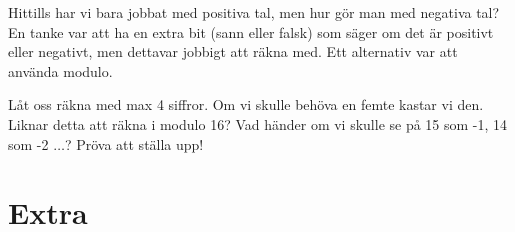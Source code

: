 \begin{problem}[Extra]
	Hittills har vi bara jobbat med positiva tal, men hur gör man med negativa tal? En tanke var att ha en extra bit (sann eller falsk) som säger om det är positivt eller negativt, men dettavar jobbigt att räkna med. Ett alternativ var att använda modulo.
	
	Låt oss räkna med max 4 siffror. Om vi skulle behöva en femte kastar vi den. Liknar detta att räkna i modulo 16? Vad händer om vi skulle se på 15 som -1, 14 som -2 \(\dots\)? Pröva att ställa upp!
\end{problem}

\section{Extra}

\begin{problem}[Extra]
\end{problem}


% 
